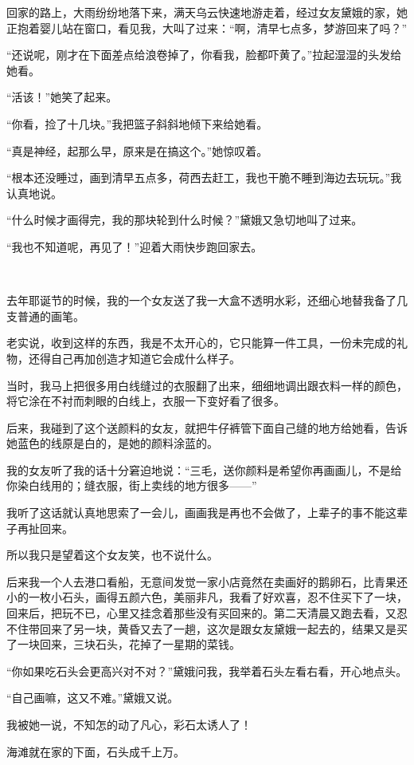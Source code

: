 \par 回家的路上，大雨纷纷地落下来，满天乌云快速地游走着，经过女友黛娥的家，她正抱着婴儿站在窗口，看见我，大叫了过来：“啊，清早七点多，梦游回来了吗？”
\par “还说呢，刚才在下面差点给浪卷掉了，你看我，脸都吓黄了。”拉起湿湿的头发给她看。
\par “活该！”她笑了起来。
\par “你看，捡了十几块。”我把篮子斜斜地倾下来给她看。
\par “真是神经，起那么早，原来是在搞这个。”她惊叹着。
\par “根本还没睡过，画到清早五点多，荷西去赶工，我也干脆不睡到海边去玩玩。”我认真地说。
\par “什么时候才画得完，我的那块轮到什么时候？”黛娥又急切地叫了过来。
\par “我也不知道呢，再见了！”迎着大雨快步跑回家去。
\par  
\par 去年耶诞节的时候，我的一个女友送了我一大盒不透明水彩，还细心地替我备了几支普通的画笔。
\par 老实说，收到这样的东西，我是不太开心的，它只能算一件工具，一份未完成的礼物，还得自己再加创造才知道它会成什么样子。
\par 当时，我马上把很多用白线缝过的衣服翻了出来，细细地调出跟衣料一样的颜色，将它涂在不衬而刺眼的白线上，衣服一下变好看了很多。
\par 后来，我碰到了这个送颜料的女友，就把牛仔裤管下面自己缝的地方给她看，告诉她蓝色的线原是白的，是她的颜料涂蓝的。
\par 我的女友听了我的话十分窘迫地说：“三毛，送你颜料是希望你再画画儿，不是给你染白线用的；缝衣服，街上卖线的地方很多——”
\par 我听了这话就认真地思索了一会儿，画画我是再也不会做了，上辈子的事不能这辈子再扯回来。
\par 所以我只是望着这个女友笑，也不说什么。
\par 后来我一个人去港口看船，无意间发觉一家小店竟然在卖画好的鹅卵石，比青果还小的一枚小石头，画得五颜六色，美丽非凡，我看了好欢喜，忍不住买下了一块，回来后，把玩不已，心里又挂念着那些没有买回来的。第二天清晨又跑去看，又忍不住带回来了另一块，黄昏又去了一趟，这次是跟女友黛娥一起去的，结果又是买了一块回来，三块石头，花掉了一星期的菜钱。
\par “你如果吃石头会更高兴对不对？”黛娥问我，我举着石头左看右看，开心地点头。
\par “自己画嘛，这又不难。”黛娥又说。
\par 我被她一说，不知怎的动了凡心，彩石太诱人了！
\par 海滩就在家的下面，石头成千上万。
